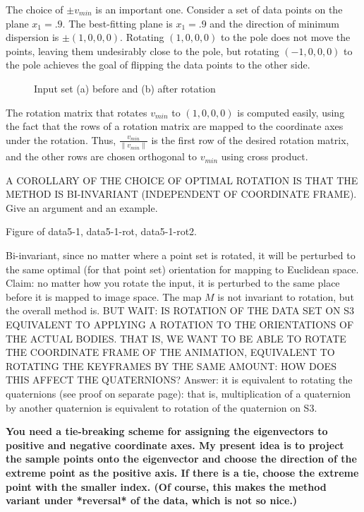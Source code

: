 \begin{example}
\label{eg:resolve}
The choice of $\pm v_{min}$ is an important one.
Consider a set of data points on the plane $x_1=.9$.
The best-fitting plane is $x_1=.9$
and the direction of minimum dispersion is $\pm(1,0,0,0)$.
Rotating $(1,0,0,0)$ to the pole does not move the points,
leaving them undesirably close to the pole,
but rotating $(-1,0,0,0)$ to the pole achieves the
goal of flipping the data points to the other side.
\end{example}

\begin{figure}
\vspace{1in}
\caption{Input set (a) before and (b) after rotation}
\label{fig:avoid}
\end{figure}

The rotation matrix that rotates $v_{min}$
to $(1,0,0,0)$ is computed easily, using the fact that the rows
of a rotation matrix are mapped to the coordinate axes under the
rotation.
Thus, $\frac{v_{min}}{\|v_{min}\|}$ is the first row of the desired rotation matrix,
and the other rows are chosen orthogonal to $v_{min}$ using
cross product.

A COROLLARY OF THE CHOICE OF OPTIMAL ROTATION IS THAT THE METHOD
IS BI-INVARIANT (INDEPENDENT OF COORDINATE FRAME).
Give an argument and an example.

Figure of data5-1, data5-1-rot, data5-1-rot2.

Bi-invariant, since no matter where a point set is rotated,
it will be perturbed to the same optimal (for that point set)
orientation for mapping to Euclidean space.
Claim: no matter how you rotate the input, it is perturbed to the same
place before it is mapped to image space.
The map $M$ is not invariant to rotation, but the overall method is.
BUT WAIT: IS ROTATION OF THE DATA SET ON S3 EQUIVALENT TO APPLYING
A ROTATION TO THE ORIENTATIONS OF THE ACTUAL BODIES.
THAT IS, WE WANT TO BE ABLE TO ROTATE THE COORDINATE FRAME OF THE 
ANIMATION, EQUIVALENT TO ROTATING THE KEYFRAMES BY THE SAME AMOUNT:
HOW DOES THIS AFFECT THE QUATERNIONS?
Answer: it is equivalent to rotating the quaternions (see proof on
separate page): that is, multiplication of a quaternion by another
quaternion is equivalent to rotation of the quaternion on S3.

{\bf You need a tie-breaking scheme for assigning
the eigenvectors to positive and negative coordinate axes.
My present idea is to project the sample points onto
the eigenvector and choose the direction of the extreme
point as the positive axis.
If there is a tie, choose the extreme point with the smaller
index.  (Of course, this makes the method variant under
*reversal* of the data, which is not so nice.)
}

